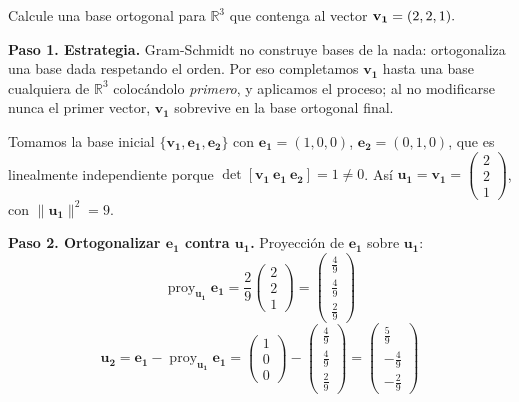 \begin{example}
Calcule una base ortogonal para $\mathbb{R}^3$ que contenga al vector ${\bf{v_1}}=(2,2,1).$
\begin{myproof}
\textbf{Paso 1. Estrategia.} Gram-Schmidt no construye bases de la nada: ortogonaliza una base dada respetando el orden. Por eso completamos $\mathbf{v_1}$ hasta una base cualquiera de $\mathbb{R}^3$ colocándolo \emph{primero}, y aplicamos el proceso; al no modificarse nunca el primer vector, $\mathbf{v_1}$ sobrevive en la base ortogonal final.

Tomamos la base inicial $\{\mathbf{v_1}, \mathbf{e_1}, \mathbf{e_2}\}$ con $\mathbf{e_1} = (1,0,0)$, $\mathbf{e_2} = (0,1,0)$, que es linealmente independiente porque $\det[\mathbf{v_1}\ \mathbf{e_1}\ \mathbf{e_2}] = 1 \neq 0$. Así $\mathbf{u_1} = \mathbf{v_1} = \begin{pmatrix} 2 \\ 2 \\ 1 \end{pmatrix}$, con $\|\mathbf{u_1}\|^2 = 9$.

\textbf{Paso 2. Ortogonalizar $\mathbf{e_1}$ contra $\mathbf{u_1}$.}
Proyección de $\mathbf{e_1}$ sobre $\mathbf{u_1}$:
\[
\operatorname{proy}_{\mathbf{u_1}} \mathbf{e_1} = \frac{2}{9} \begin{pmatrix} 2 \\ 2 \\ 1 \end{pmatrix} = \begin{pmatrix} \frac{4}{9} \\ \frac{4}{9} \\ \frac{2}{9} \end{pmatrix}
\]
\[
\mathbf{u_2} = \mathbf{e_1} - \operatorname{proy}_{\mathbf{u_1}} \mathbf{e_1} = \begin{pmatrix} 1 \\ 0 \\ 0 \end{pmatrix} - \begin{pmatrix} \frac{4}{9} \\ \frac{4}{9} \\ \frac{2}{9} \end{pmatrix} = \begin{pmatrix} \frac{5}{9} \\ -\frac{4}{9} \\ -\frac{2}{9} \end{pmatrix}
\]


\end{myproof}
\end{example}
